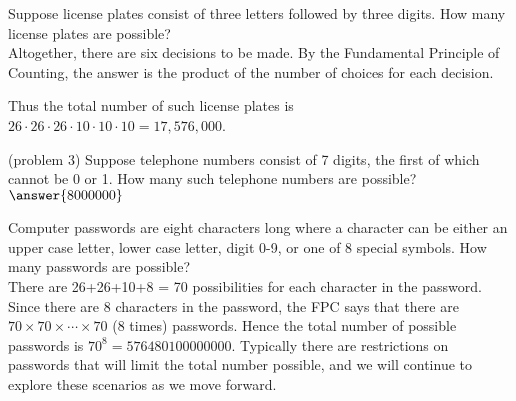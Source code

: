 \documentclass[handout]{ximera}
\begin{document}
\begin{example}[example 3]
Suppose license plates consist of three letters followed by three digits. How many license plates are possible?\\
Altogether, there are six decisions to be made. By the Fundamental Principle of Counting, the answer is the
product of the number of choices for each decision.

\begin{image}
\end{image}
Thus the total number of such license plates is $26 \cdot 26 \cdot 26 \cdot 10\cdot 10\cdot 10 = 17,576,000$.

\end{example}

\begin{problem}(problem 3)
Suppose telephone numbers consist of 7 digits, the first of which cannot be 0 or 1.  
How many such telephone numbers are possible?\\
$\answer{8000000}$

\end{problem}


\begin{example}[example 4]
Computer passwords are eight characters long where a character can be either an upper case letter, 
lower case letter, digit 0-9, or one of 8 special symbols. How many passwords are possible?\\
There are 26+26+10+8 = 70 possibilities for each character in the password. Since there are 8 characters in the password,
the FPC says that there are $70\times 70\times \cdots \times 70$ (8 times) passwords.
Hence the total number of possible passwords is $70^8 = 576480100000000$. 
Typically there are restrictions on passwords that will limit the total number possible, and we will 
continue to explore these scenarios as we move forward.
\end{example}
\end{document}
